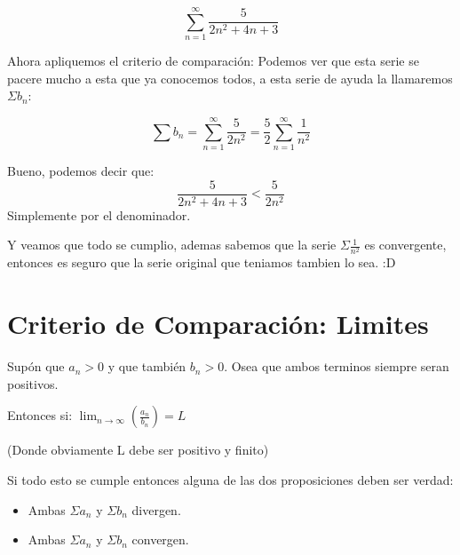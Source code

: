 \documentclass[12pt]{report}                                %
\begin{document}
            \begin{equation*}
                \sum_{n=1}^{\infty} \frac{5}{2n^2 +4n +3}
            \end{equation*}

            Ahora apliquemos el criterio de comparación: Podemos ver que esta serie se pacere mucho a esta
            que ya conocemos todos, a esta serie de ayuda la llamaremos $\Sigma b_n$:

            \begin{equation*}
                \sum b_n = \sum_{n=1}^{\infty} \frac{5}{2n^2} = \frac{5}{2}\sum_{n=1}^{\infty} \frac{1}{n^2}
            \end{equation*}

            Bueno, podemos decir que:
            \begin{equation*}
                \frac{5}{2n^2 +4n +3} < \frac{5}{2n^2}
            \end{equation*}
            Simplemente por el denominador.

            Y veamos que todo se cumplio, ademas sabemos que la serie $\Sigma \frac{1}{n^2}$ es convergente,
            entonces es seguro que la serie original que teniamos tambien lo sea. :D



    \clearpage
    \section{Criterio de Comparación: Limites}

        Supón que $a _n > 0$ y que también $b_n > 0$. Osea que ambos terminos siempre seran positivos.

        Entonces si:
        $\lim_{n \to \infty} \left( \frac{a_n}{b_n} \right) = L$

        (Donde obviamente L debe ser positivo y finito)

        Si todo esto se cumple entonces alguna de las dos proposiciones deben ser verdad:
        \begin{itemize}
            \item Ambas $\Sigma a_n$ y $\Sigma b_n$ divergen.
            \item Ambas $\Sigma a_n$ y $\Sigma b_n$ convergen.
        \end{itemize}
\end{document}
